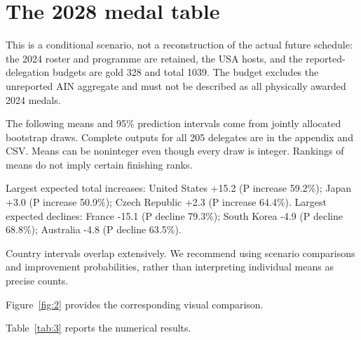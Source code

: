 \documentclass[11pt,a4paper]{article}
\begin{document}
\section{The 2028 medal table}
This is a conditional scenario, not a reconstruction of the actual future schedule: the 2024 roster and programme are retained, the USA hosts, and the reported-delegation budgets are gold 328 and total 1039. The budget excludes the unreported AIN aggregate and must not be described as all physically awarded 2024 medals.

The following means and 95\% prediction intervals come from jointly allocated bootstrap draws. Complete outputs for all 205 delegates are in the appendix and CSV. Means can be noninteger even though every draw is integer. Rankings of means do not imply certain finishing ranks.

Largest expected total increases: United States +15.2 (P increase 59.2\%); Japan +3.0 (P increase 50.9\%); Czech Republic +2.3 (P increase 64.4\%). Largest expected declines: France -15.1 (P decline 79.3\%); South Korea -4.9 (P decline 68.8\%); Australia -4.8 (P decline 63.5\%).

Country intervals overlap extensively. We recommend using scenario comparisons and improvement probabilities, rather than interpreting individual means as precise counts.

Figure~\ref{fig:2} provides the corresponding visual comparison.

Table~\ref{tab:3} reports the numerical results.
\end{document}
